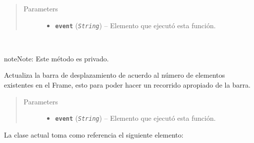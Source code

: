 \documentclass[class=report, crop=false]{standalone}
\begin{document}
\begin{fulllineitems}
\begin{fulllineitems}
\begin{quote}\begin{description}
\item[{Parameters}] \leavevmode\begin{itemize}
\item \textbf{\texttt{event}} (\emph{\texttt{String}}) -- Elemento que ejecutó esta función.
\end{itemize}
\end{description}\end{quote}

\end{fulllineitems}

\begin{fulllineitems}

~

\begin{notice}{note}{Note:}
Este método es privado.
\end{notice}

Actualiza la barra de desplazamiento de acuerdo al 
número de elementos existentes en el Frame, esto 
para poder hacer un recorrido apropiado de la barra.

\begin{quote}\begin{description}
\item[{Parameters}] \leavevmode\begin{itemize}
\item \textbf{\texttt{event}} (\emph{\texttt{String}}) -- Elemento que ejecutó esta función.
\end{itemize}
\end{description}\end{quote}

\end{fulllineitems}

\end{fulllineitems}

La clase actual toma como referencia el siguiente elemento:
\end{document}

